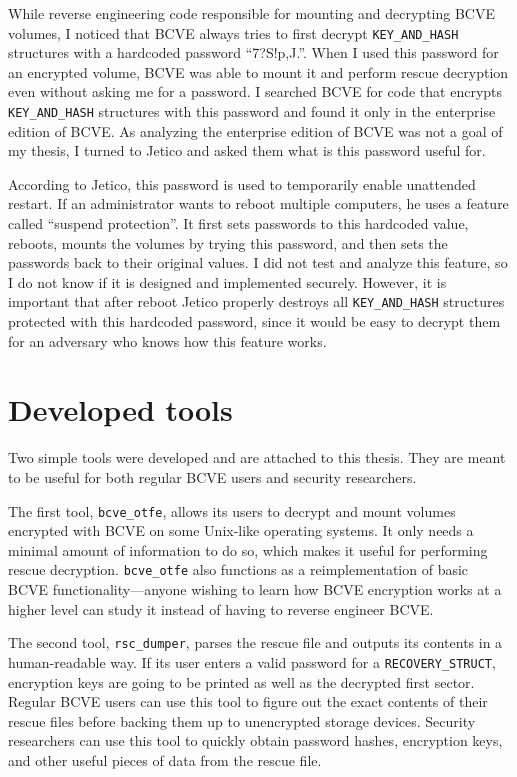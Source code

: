 \documentclass[thesis=B,english]{FITthesis}[2012/10/20]
\begin{document}
	While reverse engineering code responsible for mounting and decrypting BCVE volumes, I noticed that BCVE always tries to first decrypt \verb|KEY_AND_HASH| structures with a hardcoded password ``7?S!p,J.''. When I used this password for an encrypted volume, BCVE was able to mount it and perform rescue decryption even without asking me for a password. I searched BCVE for code that encrypts \verb|KEY_AND_HASH| structures with this password and found it only in the enterprise edition of BCVE. As analyzing the enterprise edition of BCVE was not a goal of my thesis, I turned to Jetico and asked them what is this password useful for.
	
	According to Jetico, this password is used to temporarily enable unattended restart. If an administrator wants to reboot multiple computers, he uses a feature called ``suspend protection''. It first sets passwords to this hardcoded value, reboots, mounts the volumes by trying this password, and then sets the passwords back to their original values. I did not test and analyze this feature, so I do not know if it is designed and implemented securely. However, it is important that after reboot Jetico properly destroys all \verb|KEY_AND_HASH| structures protected with this hardcoded password, since it would be easy to decrypt them for an adversary who knows how this feature works.

	\chapter{Developed tools}
	\label{ch:fifth}
	
	Two simple tools were developed and are attached to this thesis. They are meant to be useful for both regular BCVE users and security researchers. 
	
	The first tool, \verb|bcve_otfe|, allows its users to decrypt and mount volumes encrypted with BCVE on some Unix-like operating systems. It only needs a minimal amount of information to do so, which makes it useful for performing rescue decryption. \verb|bcve_otfe| also functions as a reimplementation of basic BCVE functionality---anyone wishing to learn how BCVE encryption works at a higher level can study it instead of having to reverse engineer BCVE.
	
	
	The second tool, \verb|rsc_dumper|, parses the rescue file and outputs its contents in a human-readable way. If its user enters a valid password for a \verb|RECOVERY_STRUCT|, encryption keys are going to be printed as well as the decrypted first sector. Regular BCVE users can use this tool to figure out the exact contents of their rescue files before backing them up to unencrypted storage devices. Security researchers can use this tool to quickly obtain password hashes, encryption keys, and other useful pieces of data from the rescue file.
	
\end{document}
